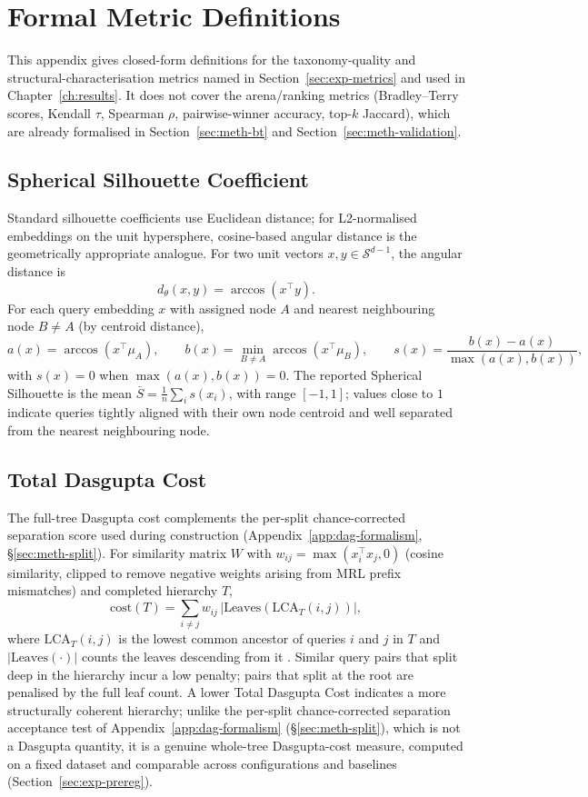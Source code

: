 \chapter{Formal Metric Definitions}\label{app:metrics}

This appendix gives closed-form definitions for the taxonomy-quality
and structural-characterisation metrics named in
Section~\ref{sec:exp-metrics} and used in
Chapter~\ref{ch:results}. It does not cover the arena/ranking metrics
(Bradley--Terry scores, Kendall $\tau$, Spearman $\rho$,
pairwise-winner accuracy, top-$k$ Jaccard), which are already
formalised in Section~\ref{sec:meth-bt} and
Section~\ref{sec:meth-validation}.

\section{Spherical Silhouette Coefficient}\label{sec:app-metrics-silhouette}

Standard silhouette coefficients use Euclidean distance; for
L2-normalised embeddings on the unit hypersphere, cosine-based
angular distance is the geometrically appropriate analogue. For two
unit vectors $x, y \in \mathcal{S}^{d-1}$, the angular distance is
\[
d_\theta(x, y) = \arccos(x^\top y).
\]
For each query embedding $x$ with assigned node $A$ and nearest
neighbouring node $B \neq A$ (by centroid distance),
\[
a(x) = \arccos(x^\top \mu_A), \qquad
b(x) = \min_{B \neq A} \arccos(x^\top \mu_B), \qquad
s(x) = \frac{b(x) - a(x)}{\max(a(x), b(x))},
\]
with $s(x) = 0$ when $\max(a(x), b(x)) = 0$. The reported Spherical
Silhouette is the mean $\bar{S} = \frac{1}{n}\sum_i s(x_i)$, with
range $[-1, 1]$; values close to $1$ indicate queries tightly aligned
with their own node centroid and well separated from the nearest
neighbouring node.

\section{Total Dasgupta Cost}\label{sec:app-metrics-dasgupta}

The full-tree Dasgupta cost complements the per-split
chance-corrected separation score used during construction
(Appendix~\ref{app:dag-formalism}, \S\ref{sec:meth-split}). For similarity
matrix $W$ with $w_{ij} = \max(x_i^\top x_j, 0)$ (cosine similarity,
clipped to remove negative weights arising from MRL prefix
mismatches) and completed hierarchy $T$,
\[
\text{cost}(T) = \sum_{i \neq j} w_{ij} \, |\text{Leaves}(\text{LCA}_T(i,j))|,
\]
where $\text{LCA}_T(i,j)$ is the lowest common ancestor of queries
$i$ and $j$ in $T$ and $|\text{Leaves}(\cdot)|$ counts the leaves
descending from it \parencite{dasgupta2016cost}. Similar query pairs
that split deep in the hierarchy incur a low penalty; pairs that
split at the root are penalised by the full leaf count. A lower Total
Dasgupta Cost indicates a more structurally coherent hierarchy; unlike
the per-split chance-corrected separation acceptance test of
Appendix~\ref{app:dag-formalism} (\S\ref{sec:meth-split}), which is
not a Dasgupta quantity, it is a genuine
whole-tree Dasgupta-cost measure, computed on a fixed dataset and
comparable across configurations and
baselines (Section~\ref{sec:exp-prereg}).

